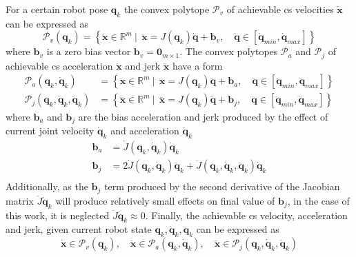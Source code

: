 For a certain robot pose $\bm{q}_k$ the convex polytope $\mathcal{P}_v$ of achievable \gls{cs} velocities $\dot{\bm{x}}$ can be expressed as
\begin{equation}
    \mathcal{P}_v(\bm{q}_k) = \left\{ \dot{\bm{x}}\in\mathbb{R}^m ~|~~ \dot{\bm{x}}=J(\bm{q}_k)\dot{\bm{q}} + \bm{b}_v, \quad \dot{\bm{q}}\in \left[\dot{\bm{q}}_{min}, \dot{\bm{q}}_{max} \right] \right\}
    \label{eq:vel_poly}
\end{equation}
where $\bm{b}_v$ is a zero bias vector $\bm{b}_v\!=\!\bm{0}_{m\times 1}$. The convex polytopes $\mathcal{P}_a$ and $\mathcal{P}_j$ of achievable \gls{cs} acceleration $\ddot{\bm{x}}$ and jerk $\dddot{\bm{x}}$ have a form
\begin{equation}
\begin{split}
    \mathcal{P}_a(\bm{q}_k,\dot{\bm{q}}_k)  &= \left\{ \ddot{\bm{x}}\in\mathbb{R}^m ~|~~ \ddot{\bm{x}}=J(\bm{q}_k)\ddot{\bm{q}} + \bm{b}_a, \quad \ddot{\bm{q}}\in \left[\ddot{\bm{q}}_{min}, \ddot{\bm{q}}_{max} \right] \right\}\\
    \mathcal{P}_j(\bm{q}_k,\dot{\bm{q}}_k,\ddot{\bm{q}}_k) &= \left\{ \dddot{\bm{x}}\in\mathbb{R}^m ~|~~ \dddot{\bm{x}}=J(\bm{q}_k)\dddot{\bm{q}} +\bm{b}_j, \quad \dddot{\bm{q}}\in \left[\dddot{\bm{q}}_{min}, \dddot{\bm{q}}_{max} \right] \right\}
\end{split}\label{eq:jerk_acc_poly}
\end{equation}
where $\bm{b}_a$ and $\bm{b}_j$ are the bias acceleration and jerk produced by the effect of current joint velocity $\dot{\bm{q}}_k$ and acceleration $\ddot{\bm{q}}_k$ 
\begin{equation}
\begin{split}
\bm{b}_a&= \dot{J}(\bm{q}_k,\dot{\bm{q}}_k)\dot{\bm{q}}_k\\
\bm{b}_j&= 2\dot{J}(\bm{q}_k,\dot{\bm{q}}_k)\ddot{\bm{q}}_k + \ddot{J}(\bm{q}_k,\dot{\bm{q}}_k,\ddot{\bm{q}}_k)\dot{\bm{q}}_k\\
 \end{split} \label{eq:bias_terms}
\end{equation}
Additionally, as the $\bm{b}_j$ term produced by the second derivative of the Jacobian matrix $\ddot{J}\dot{\bm{q}}_k$ will produce relatively small effects on final value of $\bm{b}_j$, in the case of this work, it is neglected $\ddot{J}\dot{\bm{q}}_k \approx 0$. Finally, the achievable \gls{cs} velocity, acceleration and jerk, given current robot state $\bm{q}_k,\dot{\bm{q}}_k,\ddot{\bm{q}}_k$ can be expressed as
\begin{equation}
    \dot{\bm{x}}\in \mathcal{P}_v(\bm{q}_k), \quad \ddot{\bm{x}}\in \mathcal{P}_a(\bm{q}_k,\dot{\bm{q}}_k), \quad \dddot{\bm{x}}\in \mathcal{P}_j(\bm{q}_k,\dot{\bm{q}}_k,\ddot{\bm{q}}_k)\label{eq:limits_poly}
\end{equation}

